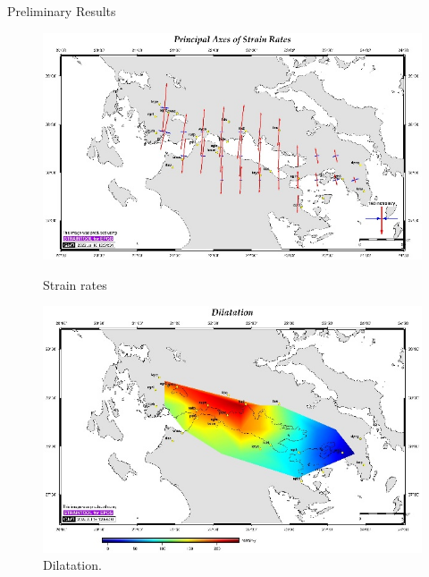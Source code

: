 \documentclass[final,a0,portrait]{beamer}
\newlength{\onecolwid}
\begin{document}
\begin{frame}[t]
\begin{columns}[t]
\begin{column}{\onecolwid}
\begin{block}{Preliminary Results}
{\begin{figure}
\centering
\begin{minipage}{.5\textwidth}
    \centering
    \includegraphics[width=1\linewidth]{gsg2022_str.jpg}
    \caption{Strain rates} %
    \label{fig:strain}
\end{minipage}%
\begin{minipage}{.5\textwidth}
    \centering
    \includegraphics[width=1\linewidth]{gsg2022_dil.jpg}
    \caption{Dilatation.}
    \label{fig:dil}
\end{minipage}
\end{figure}


}
\end{block}



\end{column}
\end{columns}
\end{frame}
\end{document}

